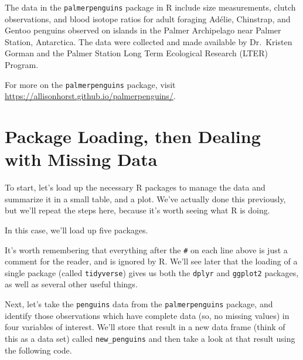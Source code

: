 \documentclass[
]{book}
\newenvironment{Shaded}{\begin{snugshade}}{\end{snugshade}}
\newcommand{\CommentTok}[1]{\textcolor[rgb]{0.56,0.35,0.01}{\textit{#1}}}
\newcommand{\KeywordTok}[1]{\textcolor[rgb]{0.13,0.29,0.53}{\textbf{#1}}}
\newcommand{\NormalTok}[1]{#1}
\begin{document}
The data in the \texttt{palmerpenguins} package in R include size measurements, clutch observations, and blood isotope ratios for adult foraging Adélie, Chinstrap, and Gentoo penguins observed on islands in the Palmer Archipelago near Palmer Station, Antarctica. The data were collected and made available by Dr.~Kristen Gorman and the Palmer Station Long Term Ecological Research (LTER) Program.

For more on the \texttt{palmerpenguins} package, visit \url{https://allisonhorst.github.io/palmerpenguins/}.

\hypertarget{package-loading-then-dealing-with-missing-data}{%
\section{Package Loading, then Dealing with Missing Data}\label{package-loading-then-dealing-with-missing-data}}

To start, let's load up the necessary R packages to manage the data and summarize it in a small table, and a plot. We've actually done this previously, but we'll repeat the steps here, because it's worth seeing what R is doing.

In this case, we'll load up five packages.

\begin{Shaded}
\end{Shaded}

It's worth remembering that everything after the \texttt{\#} on each line above is just a comment for the reader, and is ignored by R. We'll see later that the loading of a single package (called \texttt{tidyverse}) gives us both the \texttt{dplyr} and \texttt{ggplot2} packages, as well as several other useful things.

Next, let's take the \texttt{penguins} data from the \texttt{palmerpenguins} package, and identify those observations which have complete data (so, no missing values) in four variables of interest. We'll store that result in a new data frame (think of this as a data set) called \texttt{new\_penguins} and then take a look at that result using the following code.
\end{document}
